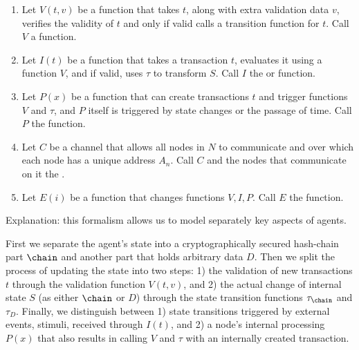 \documentclass[twocolumn,showpacs,%
  nofootinbib,aps,superscriptaddress,%
  eqsecnum,prd,notitlepage,showkeys,10pt]{revtex4-1}
\begin{document}
\begin{enumerate}
\begin{enumerate}
\end{enumerate}
\item Let $V(t,v)$ be a function that takes $t$, along with extra validation data $v$, verifies the validity of $t$ and only if valid calls a transition function for $t$. Call $V$ a  function.
\label{formalism:validation}
\item Let $I(t)$ be a function that takes a transaction $t$, evaluates it using a function $V$, and if valid, uses $\tau$ to transform $S$. Call $I$ the  or  function.
\item Let $P(x)$ be a function that can create transactions $t$ and trigger functions $V$ and $\tau$, and $P$ itself is triggered by state changes or the passage of time.  Call $P$ the  function.
\item Let $C$ be a channel that allows all nodes in $N$ to communicate and over which each node has a unique address $A_n$. Call $C$ and the nodes that communicate on it the .
\item Let $E(i)$ be a function that changes functions $V,I,P$.  Call $E$ the  function.
\end{enumerate}

Explanation: this formalism allows us to model separately key aspects of agents.

First we separate the agent's state into a cryptographically secured hash-chain part $\chain$ and another part that holds arbitrary data $D$. Then we split the process of updating the state into two steps: 1) the validation of new transactions $t$ through the validation function $V(t,v)$, and 2) the actual change of internal state $S$ (as either $\chain$ or $D$) through the state transition functions $\tau_\chain$ and $\tau_D$. Finally, we distinguish between 1) state transitions triggered by external events, stimuli, received through $I(t)$, and 2) a node's internal processing $P(x)$ that also results in calling $V$ and $\tau$ with an internally created transaction.
\end{document}
